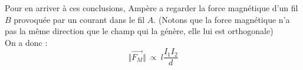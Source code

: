 \documentclass	[11pt, a4paper, openany]{book}
\begin{document}
Pour en arriver à ces conclusions, Ampère a regarder la force magnétique d'un fil $B$ provoquée par un courant dans le fil $A$. (Notons que la force magnétique n'a pas la même direction que le champ qui la génère, elle lui est orthogonale)
\\
On a donc :
\begin{equation}
\Vert \vec{F_M} \Vert\ \propto\ l \frac{I_1 I_2}{d}
\end{equation}

\end{document}
